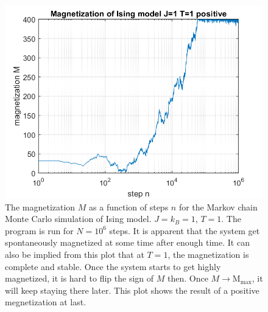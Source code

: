 \documentclass[12pt, graphicx]{article}
\begin{document}
\begin{figure}[ht]
\centering
\includegraphics[width = 120mm]{mt1p.png}
\caption{The magnetization $M$ as a function of steps $n$ for the Markov chain Monte Carlo simulation of Ising model. $J=k_B=1$, $T=1$. The program is run for $N=10^6$ steps. It is apparent that the system get spontaneously magnetized at some time after enough time. It can also be implied from this plot that at $T=1$, the magnetization is complete and stable. Once the system starts to get highly magnetized, it is hard to flip the sign of $M$ then. Once $M\to\mathrm{M_{max}}$, it will keep staying there later. This plot shows the result of a positive megnetization at last.}
\label{fig:mt1p}
\end{figure}
\end{document}
